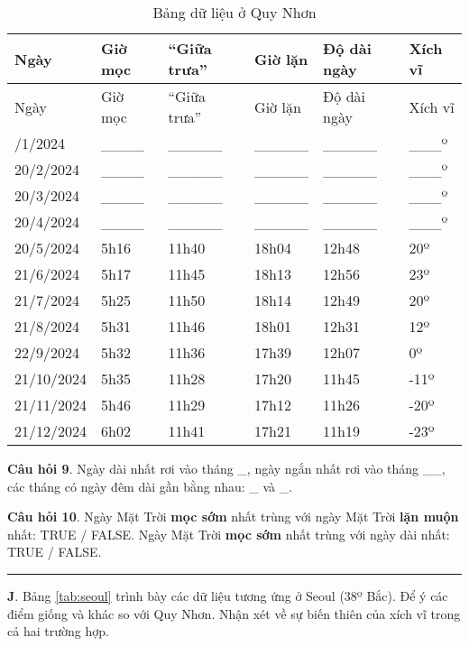 \documentclass[
  a4paper,
]{book}
\begin{document}
\begin{longtable}[]{@{}llllll@{}}
\caption{\label{tab:sunrise} Bảng dữ liệu ở Quy Nhơn}\tabularnewline
\toprule\noalign{}
Ngày & Giờ mọc & ``Giữa trưa'' & Giờ lặn & Độ dài ngày & Xích vĩ \\
\midrule\noalign{}
\endfirsthead
\toprule\noalign{}
Ngày & Giờ mọc & ``Giữa trưa'' & Giờ lặn & Độ dài ngày & Xích vĩ \\
\midrule\noalign{}
\endhead
\bottomrule\noalign{}
\endlastfoot
20/1/2024 & \_\_\_\_ & \_\_\_\_\_ & \_\_\_\_\_ & \_\_\_\_\_ & \_\_\_º \\
20/2/2024 & \_\_\_\_ & \_\_\_\_\_ & \_\_\_\_\_ & \_\_\_\_\_ & \_\_\_º \\
20/3/2024 & \_\_\_\_ & \_\_\_\_\_ & \_\_\_\_\_ & \_\_\_\_\_ & \_\_\_º \\
20/4/2024 & \_\_\_\_ & \_\_\_\_\_ & \_\_\_\_\_ & \_\_\_\_\_ & \_\_\_º \\
20/5/2024 & 5h16 & 11h40 & 18h04 & 12h48 & 20º \\
21/6/2024 & 5h17 & 11h45 & 18h13 & 12h56 & 23º \\
21/7/2024 & 5h25 & 11h50 & 18h14 & 12h49 & 20º \\
21/8/2024 & 5h31 & 11h46 & 18h01 & 12h31 & 12º \\
22/9/2024 & 5h32 & 11h36 & 17h39 & 12h07 & 0º \\
21/10/2024 & 5h35 & 11h28 & 17h20 & 11h45 & -11º \\
21/11/2024 & 5h46 & 11h29 & 17h12 & 11h26 & -20º \\
21/12/2024 & 6h02 & 11h41 & 17h21 & 11h19 & -23º \\
\end{longtable}

\textbf{Câu hỏi 9}. Ngày dài nhất rơi vào tháng \_, ngày ngắn nhất rơi vào tháng \_\_, các tháng có ngày đêm dài gần bằng nhau: \_ và \_.

\textbf{Câu hỏi 10}. Ngày Mặt Trời \textbf{mọc sớm} nhất trùng với ngày Mặt Trời \textbf{lặn muộn} nhất: TRUE / FALSE. Ngày Mặt Trời \textbf{mọc sớm} nhất trùng với ngày dài nhất: TRUE / FALSE.

\begin{center}\rule{0.5\linewidth}{0.5pt}\end{center}

\textbf{J}. Bảng \ref{tab:seoul} trình bày các dữ liệu tương ứng ở Seoul (38º Bắc). Để ý các điểm giống và khác so với Quy Nhơn. Nhận xét về sự biến thiên của xích vĩ trong cả hai trường hợp.
\end{document}
